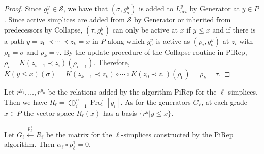 \documentclass[english,a4paper,nolineno,cleveref]{socg-lipics-v2021}
\DeclareMathOperator{\proj}{Proj}
\begin{document}
\begin{proof}
Since $g^y_\sigma\in\mathcal{S}$, we have that $(\sigma,g^y_\sigma)$ is added to $L_{act}^y$ by {\sc Generator} at $y\in P$. Since active simplices are added from $\mathcal{S}$ by {\sc Generator} or inherited from predecessors by {\sc Collapse}, $(\tau,g^y_\sigma)$ can only be active at $x$ if $y\leq x$ and if there is a path $y=z_0\prec\cdots \prec z_k=x$ in $P$ along which $g^y_\sigma$ is active as $(\rho_i,g^y_\sigma)$ at $z_i$ with $\rho_0=\sigma$ and $\rho_k=\tau$. By the update procedure of the {\sc Collapse} routine in {\sc PiRep}, $\rho_i=K(z_{i\minus 1}\prec z_i)(\rho_{i\minus 1})$. Therefore, $K(y\leq x)(\sigma)=K(z_{k\minus 1}\prec z_k)\circ\cdots\circ K(z_0\prec z_1)(\rho_0)=\rho_k=\tau$.      
\end{proof}


Let $r^{y_1},\ldots,r^{y_n}$ be the relations added by the algorithm {\sc PiRep} for the $\ell$-simplices. Then we have $R_\ell=\bigoplus_{i=1}^n\proj[y_i]$. As for the generators $G_\ell$, at each grade $x\in P$ the vector space $R_\ell(x)$ has a basis $\{r^{y}\vert y\leq x\}$.   

\begin{proposition} \label{prop:p_exact_1}
Let $G_\ell\xleftarrow{p_\ell^1}R_\ell$ be the matrix for the $\ell$-simplices constructed by the {\sc PiRep} algorithm. Then $\alpha_\ell\circ p_\ell^1=0$.
\end{proposition}
\end{document}
